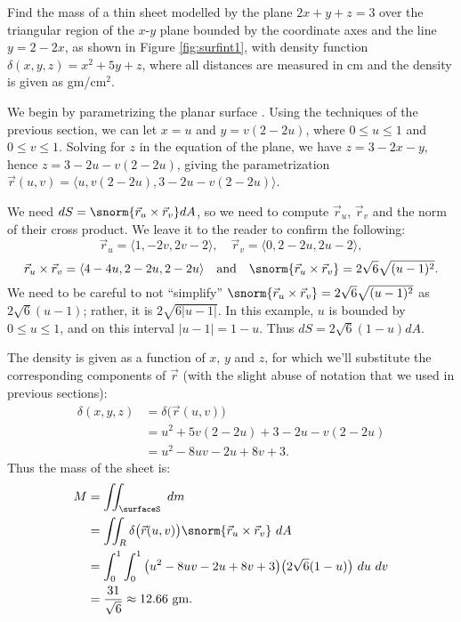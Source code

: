 {Find the mass of a thin sheet modelled by the plane $2x+y+z=3$ over the triangular region of the $x$-$y$ plane bounded by the coordinate axes and the line $y=2-2x$, as shown in Figure \ref{fig:surfint1}, with density function $\delta(x,y,z) = x^2+5y+z$, where all distances are measured in cm and the density is given as gm/cm$^2$. 
}
{We begin by parametrizing the planar surface \surfaceS. Using the techniques of the previous section, we can let $x=u$ and $y=v(2-2u)$, where $0\leq u\leq 1$ and $0\leq v\leq 1$. Solving for $z$ in the equation of the plane, we have $z=3-2x-y$, hence $z = 3-2u-v(2-2u)$, giving the parametrization
$\vec r(u,v) = \langle u, v(2-2u), 3-2u-v(2-2u)\rangle$.


We need $dS=\snorm{\vec r_u\times \vec r_v}dA$, so we need to compute $\vec r_u$, $\vec r_v$ and the norm of their cross product. We leave it to the reader to confirm the following:
\[
\vec r_u = \langle 1,-2v,2v-2\rangle,\quad \vec r_v = \langle 0,2-2u, 2u-2\rangle,
\]
\[
\vec r_u\times \vec r_v = \langle 4-4u,2-2u,2-2u\rangle\quad \text{and}\quad \snorm{\vec r_u\times \vec r_v} = 2\sqrt{6}\sqrt{(u-1)^2}.
\]
We need to be careful to not ``simplify'' $\snorm{\vec r_u\times \vec r_v} = 2\sqrt{6}\sqrt{(u-1)^2}$ as $2\sqrt{6}(u-1)$; rather, it is $2\sqrt{6\lvert u-1\rvert}$. In this example, $u$ is bounded by $0\leq u\leq 1$, and on this interval $\lvert u-1\rvert = 1-u$. Thus $dS = 2\sqrt{6}(1-u)dA$. 

The density is given as a function of $x$, $y$ and $z$, for which we'll substitute the corresponding components of $\vec r$ (with the slight abuse of notation that we used in previous sections): 
\begin{align*}
\delta(x,y,z) &= \delta\big(\vec r(u,v)\big) \\
			&= u^2 + 5v(2-2u)+3-2u-v(2-2u)\\
			&= u^2-8uv-2u+8v+3.
\end{align*}
Thus the mass of the sheet is:
\begin{align*}
M &= \iint_\surfaceS\ dm\\
	&= \iint_R \delta\big(\vec r(u,v)\big)\snorm{\vec r_u\times \vec r_v}\ dA\\
	&= \int_0^1\int_0^1 \big(u^2-8uv-2u+8v+3\big)\big(2\sqrt{6}(1-u)\big)\ du\ dv\\
	&= \frac{31}{\sqrt{6}} \approx 12.66 \text{ gm.}
\end{align*}
}\\

